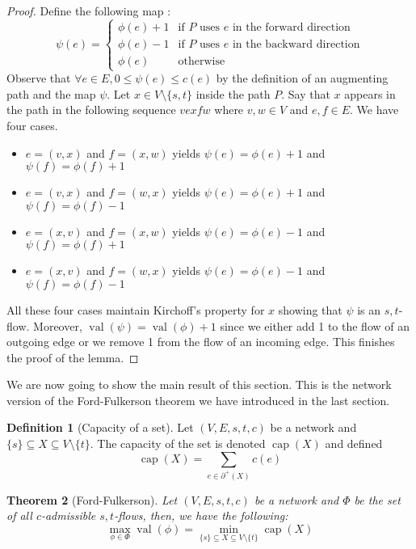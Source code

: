 \documentclass{tufte-handout}
\newtheorem{thm}{Theorem}
\theoremstyle{definition}
\newtheorem{defn}[thm]{Definition}
\theoremstyle{remark}
\DeclareMathOperator{\val}{val}
\DeclareMathOperator{\capac}{cap}
\begin{document}
\begin{proof}
	Define the following map :
	\[ \psi(e) = \begin{cases} \phi(e)+1 &\mbox{if $P$ uses $e$ in the forward direction}\\
	\phi(e)-1 &\mbox{if $P$ uses $e$ in the backward direction}\\
	\phi(e) &\mbox{otherwise}\end{cases} \]
	Observe that $\forall e\in E, 0\leq \psi(e) \leq c(e)$ by the definition of an augmenting path and the map $\psi$. Let $x \in V \setminus \{s,t\}$ inside the path $P$. Say that $x$ appears in the path in the following sequence $vexfw$ where $v,w \in V$ and $e,f \in E$. We have four cases.
	\begin{itemize}
		\item $e = (v,x)$ and $f=(x,w)$ yields $\psi(e) = \phi(e) + 1$ and $\psi(f) = \phi(f) +1$
		\item $e = (v,x)$ and $f=(w,x)$ yields $\psi(e) = \phi(e) + 1$ and $\psi(f) = \phi(f) - 1$
		\item $e = (x,v)$ and $f=(x,w)$ yields $\psi(e) = \phi(e) - 1$ and $\psi(f) = \phi(f) +1$
		\item $e = (x,v)$ and $f=(w,x)$ yields $\psi(e) = \phi(e) - 1$ and $\psi(f) = \phi(f) - 1$
	\end{itemize}
	All these four cases maintain Kirchoff's property for $x$ showing that $\psi$ is an $s,t$-flow. Moreover, $\val(\psi) = \val(\phi)+1$ since we either add 1 to the flow of an outgoing edge or we remove 1 from the flow of an incoming edge. This finishes the proof of the lemma.
\end{proof}
We are now going to show the main result of this section. This is the network version of the Ford-Fulkerson theorem we have introduced in the last section.
\begin{defn}[Capacity of a set]
	Let $(V,E,s,t,c)$ be a network and $\{s\} \subseteq X \subseteq V\setminus\{t\}$. The capacity of the set is denoted $\capac(X)$ and defined \[\capac(X) = \sum_{e \in \partial^+(X)} c(e)\]
\end{defn}
\begin{thm}[Ford-Fulkerson]
	Let $(V,E,s,t,c)$ be a network and $\Phi$ be the set of all $c$-admissible $s,t$-flows, then, we have the following:
	\[ \max_{\phi \in \Phi} \val(\phi) = \min_{\{s\} \subseteq X \subseteq V \setminus \{t\}} \capac(X) \]
\end{thm}
\end{document}
